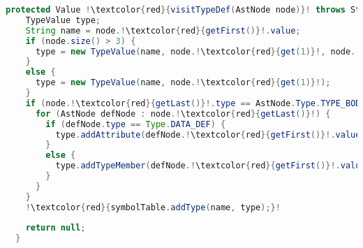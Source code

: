 \begin{lstlisting}[language=Java,escapechar=!]
protected Value !\textcolor{red}{visitTypeDef(AstNode node)}! throws StandardError {
    TypeValue type;
    String name = node.!\textcolor{red}{getFirst()}!.value;
    if (node.size() > 3) {
      type = new TypeValue(name, node.!\textcolor{red}{get(1)}!, node.!\textcolor{red}{get(2)}!.value, !\textcolor{red}{node.get(3)}!);
    }
    else {
      type = new TypeValue(name, node.!\textcolor{red}{get(1)}!);
    }
    if (node.!\textcolor{red}{getLast()}!.type == AstNode.Type.TYPE_BODY) {
      for (AstNode defNode : node.!\textcolor{red}{getLast()}!) {
        if (defNode.type == Type.DATA_DEF) {
          type.addAttribute(defNode.!\textcolor{red}{getFirst()}!.value, new Member(defNode));
        }
        else {
          type.addTypeMember(defNode.!\textcolor{red}{getFirst()}!.value, new Member(defNode));
        }
      }
    }
    !\textcolor{red}{symbolTable.addType(name, type);}!
    
    return null;
  }
\end{lstlisting}

